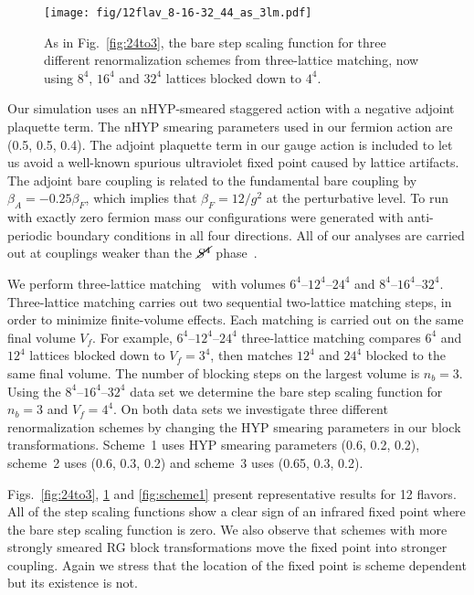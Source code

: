 \documentclass{PoS}
\newcommand{\Sb}{\ensuremath{\cancel{S^4}} }
\newcommand{\fig}[1]{Fig.~\ref{#1}}
\begin{document}
\begin{figure}[ht]
  \centering
  \texttt{[image: fig/12flav\_8-16-32\_44\_as\_3lm.pdf]}
  \caption{As in \protect\fig{fig:24to3}, the bare step scaling function for three different renormalization schemes from three-lattice matching, now using $8^4$, $16^4$ and $32^4$ lattices blocked down to $4^4$.}
\label{fig:32to4}
\end{figure}

Our simulation uses an nHYP-smeared staggered action with a negative adjoint plaquette term.
The nHYP smearing parameters used in our fermion action are (0.5, 0.5, 0.4).
The adjoint plaquette term in our gauge action is included to let us avoid a well-known spurious ultraviolet fixed point caused by lattice artifacts.
The adjoint bare coupling is related to the fundamental bare coupling by $\beta_A = -0.25\beta_F$, which implies that $\beta_F = 12 / g^2$ at the perturbative level.
To run with exactly zero fermion mass our configurations were generated with anti-periodic boundary conditions in all four directions.
All of our analyses are carried out at couplings weaker than the \Sb phase~\cite{Cheng:2011ic, Hasenfratz:2013uha}.

We perform three-lattice matching~\cite{Hasenfratz:2011xn} with volumes $6^4$--$12^4$--$24^4$ and $8^4$--$16^4$--$32^4$.
Three-lattice matching carries out two sequential two-lattice matching steps, in order to minimize finite-volume effects.
Each matching is carried out on the same final volume $V_f$.
For example, $6^4$--$12^4$--$24^4$ three-lattice matching compares $6^4$ and $12^4$ lattices blocked down to $V_f = 3^4$, then matches $12^4$ and $24^4$ blocked to the same final volume.
The number of blocking steps on the largest volume is $n_b = 3$.
Using the $8^4$--$16^4$--$32^4$ data set we determine the bare step scaling function for $n_b = 3$ and $V_f = 4^4$.
On both data sets we investigate three different renormalization schemes by changing the HYP smearing parameters in our block transformations.
Scheme~1 uses HYP smearing parameters (0.6, 0.2, 0.2), scheme~2 uses (0.6, 0.3, 0.2) and scheme~3 uses (0.65, 0.3, 0.2).

Figs.~\ref{fig:24to3}, \ref{fig:32to4} and \ref{fig:scheme1} present representative results for 12 flavors.
All of the step scaling functions show a clear sign of an infrared fixed point where the bare step scaling function is zero.
We also observe that schemes with more strongly smeared RG block transformations move the fixed point into stronger coupling.
Again we stress that the location of the fixed point is scheme dependent but its existence is not.
\end{document}
